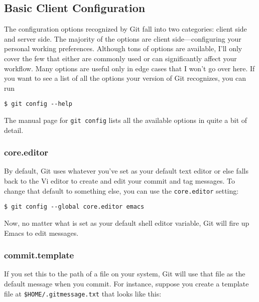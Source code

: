 \documentclass[a4paper]{book}
\begin{document}
\subsection{Basic Client Configuration}

The configuration options recognized by Git fall into two categories: client side and server side. The majority of the options are client side---configuring your personal working preferences. Although tons of options are available, I'll only cover the few that either are commonly used or can significantly affect your workflow. Many options are useful only in edge cases that I won't go over here. If you want to see a list of all the options your version of Git recognizes, you can run

\begin{shaded}\begin{verbatim}
$ git config --help
\end{verbatim}\end{shaded}

The manual page for \texttt{git config} lists all the available options in quite a bit of detail.

\subsubsection{core.editor}

By default, Git uses whatever you've set as your default text editor or else falls back to the Vi editor to create and edit your commit and tag messages. To change that default to something else, you can use the \texttt{core.editor} setting:

\begin{shaded}\begin{verbatim}
$ git config --global core.editor emacs
\end{verbatim}\end{shaded}

Now, no matter what is set as your default shell editor variable, Git will fire up Emacs to edit messages.

\subsubsection{commit.template}

If you set this to the path of a file on your system, Git will use that file as the default message when you commit. For instance, suppose you create a template file at \texttt{\$HOME/.gitmessage.txt} that looks like this:
\end{document}
